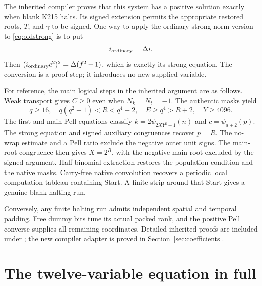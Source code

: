 \documentclass[11pt,letterpaper]{article}
\theoremstyle{remark}\newtheorem{remark}[theorem]{Remark}
\newcommand{\pathtext}[1]{\texttt{\detokenize{#1}}}
\begin{document}
The inherited compiler proves that this system has a positive solution
exactly when blank K215 halts. Its signed extension permits the appropriate
restored roots, $T$, and $\gamma$ to be signed. One way to apply the ordinary
strong-norm version to \eqref{eq:oldstrong} is to put
\begin{equation}\label{eq:ordinaryconvert}
 i_{\rm ordinary}=\Delta i.
\end{equation}
Then $(i_{\rm ordinary}c^2)^2=\Delta(f^2-1)$, which is exactly its strong
equation. The conversion is a proof step; it introduces no new supplied variable.

For reference, the main logical steps in the inherited argument are as follows.
Weak transport gives $C\geq0$ even when $N_k=N_t=-1$. The authentic masks yield
\begin{equation}\label{eq:bootstrap}
 q\geq16,\quad q(q^2-1)<R<q^4-2,
 \quad E\geq q^4>R+2,\quad Y\geq4096.
\end{equation}
The first and main Pell equations classify $k=2\psi_{2XY^2+1}(n)$ and
$c=\psi_{a+2}(p)$. The strong equation and signed auxiliary congruences recover
$p=R$. The no-wrap estimate and a Pell ratio exclude the negative outer
unit signs. The main-root congruence then gives $X=2^R$, with the negative
main root excluded by the signed argument. Half-binomial extraction restores
the population condition and the native masks. Carry-free native convolution
recovers a periodic local computation tableau containing Start. A finite
strip around that Start gives a genuine blank halting run.

Conversely, any finite halting run admits independent spatial and temporal
padding. Free dummy bits tune its actual packed rank, and the positive Pell
converse supplies all remaining coordinates. Detailed inherited proofs are
included under \pathtext{reference/}; the new compiler adapter is proved in
Section~\ref{sec:coefficients}.

\section{The twelve-variable equation in full}\label{sec:equation}
\end{document}
